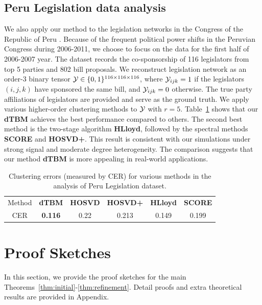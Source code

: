 \documentclass[lettersize,onecolumn,journal]{IEEEtran}
\theoremstyle{definition}
\theoremstyle{definition}
\begin{document}
\subsection{Peru Legislation data analysis}

We also apply our method to the legislation networks in the Congress of the Republic of Peru \citep{lee2017time}. Because of the frequent political power shifts in the Peruvian Congress during 2006-2011, we choose to focus on the data for the first half of 2006-2007 year. The dataset records the co-sponsorship of 116 legislators from top 5 parties and 802 bill proposals. We reconstruct legislation network as an order-3 binary tensor $\mathcal{Y} \in \{0,1\}^{116 \times 116 \times 116}$, where $\mathcal{Y}_{ijk} = 1$ if the legislators $(i,j,k)$ have sponsored the same bill, and $\mathcal{Y}_{ijk} = 0$ otherwise. The true party affiliations of legislators are provided and serve as the ground truth. We apply various higher-order clustering methods to $\mathcal{Y}$ with $r = 5$. Table~\ref{tab:peru} shows that our \textbf{\small dTBM} achieves the best performance compared to others. The second best method is the two-stage algorithm \textbf{\small HLloyd}, followed by the spectral methods \textbf{\small SCORE} and \textbf{\small HOSVD+}. This result is consistent with our simulations under strong signal and moderate degree heterogeneity. The comparison suggests that our method \textbf{\small dTBM} is more appealing in real-world applications.

\begin{table}[ht]
    \centering
    \begin{tabular}{c |c  c cc c}
    \hline
        Method & \textbf{\small dTBM} 
        &\textbf{\small HOSVD}
        &\textbf{\small HOSVD+} & \textbf{\small HLloyd} &  \textbf{\small SCORE}\\
         CER & \textbf{0.116}
         &  0.22 
         &0.213 & 0.149 &0.199\\
         \hline
    \end{tabular}
    \caption{Clustering errors (measured by CER) for various methods in the analysis of Peru Legislation dataset.}
    \label{tab:peru}
\end{table}



\section{Proof Sketches}\label{sec:mainproof}

In this section, we provide the proof sketches for the main Theorems~\ref{thm:initial}-\ref{thm:refinement}. Detail proofs and extra theoretical results are provided in Appendix.
\end{document}

